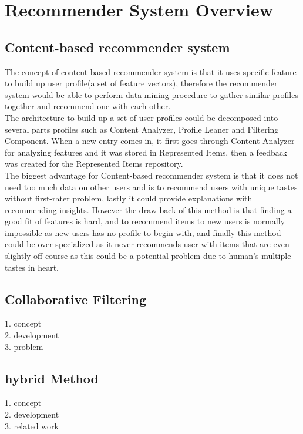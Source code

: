 \documentclass[conference]{IEEEtran}
\begin{document}
\section{Recommender System Overview}
\subsection{Content-based recommender system}
The concept of content-based recommender system is that it uses specific feature to build up user profile(a set of feature vectors), therefore the recommender system would be able to perform data mining procedure to gather similar profiles together and recommend one with each other. \\
\indent The architecture to build up a set of user profiles could be decomposed into several parts profiles\cite{Lops2011} such as Content Analyzer, Profile Leaner and Filtering Component. When a new entry comes in, it first goes through Content Analyzer for analyzing features and it was stored in Represented Items, then a feedback was created for the Represented Items repository.\\
\indent The biggest advantage for Content-based recommender system is that it does not need too much data on other users and is to recommend users with unique tastes without first-rater problem, lastly it could provide explanations with recommending insights. However the draw back of this method is that finding a good fit of features is hard, and to recommend items to new users is normally impossible as new users has no profile to begin with, and finally this method could be over specialized as it never recommends user with items that are even slightly off course as this could be a potential problem due to human's multiple tastes in heart. 

\subsection{Collaborative Filtering}

    1. concept\\
    2. development\\
    3. problem\\

\subsection{hybrid Method}

    1. concept\\
    2. development\\
    3. related work\\
\end{document}
